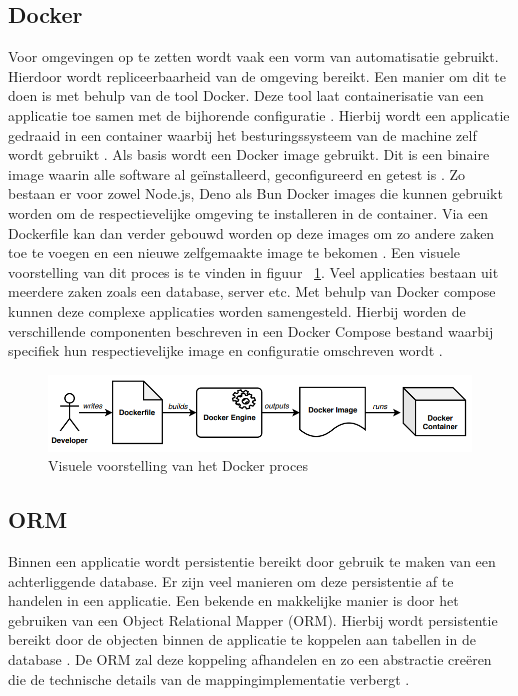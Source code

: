 \subsection{Docker}
Voor omgevingen op te zetten wordt vaak een vorm van automatisatie gebruikt. 
Hierdoor wordt repliceerbaarheid van de omgeving bereikt. Een manier om dit te doen is met behulp van de tool Docker.
Deze tool laat containerisatie van een applicatie toe samen met de bijhorende configuratie \textcite{Ibrahim2021}.
Hierbij wordt een applicatie gedraaid in een container waarbij het besturingssysteem van de machine zelf wordt gebruikt \textcite{Boettiger2015}.
Als basis wordt een Docker image gebruikt. Dit is een binaire image waarin alle software al geïnstalleerd, geconfigureerd en getest is \textcite{Boettiger2015}.
Zo bestaan er voor zowel Node.js, Deno als Bun Docker images die kunnen gebruikt worden om de respectievelijke omgeving te installeren in de container.
Via een Dockerfile kan dan verder gebouwd worden op deze images om zo andere zaken toe te voegen en een nieuwe zelfgemaakte image te bekomen \textcite{Boettiger2015}.
Een visuele voorstelling van dit proces is te vinden in figuur ~\ref{fig:dockerproces}.
Veel applicaties bestaan uit meerdere zaken zoals een database, server etc. 
Met behulp van Docker compose kunnen deze complexe applicaties worden samengesteld. 
Hierbij worden de verschillende componenten beschreven in een Docker Compose bestand waarbij specifiek hun
respectievelijke image en configuratie omschreven wordt \textcite{Ibrahim2021}.
\begin{figure}[H]
    \centering
    \includegraphics[width=.9\textwidth]{graphics/docker_proces.png}
    \caption{\label{fig:dockerproces}Visuele voorstelling van het Docker proces ~\autocite{Ibrahim2021}}
\end{figure}

\subsection{ORM}
Binnen een applicatie wordt persistentie bereikt door gebruik te maken van een achterliggende database. 
Er zijn veel manieren om deze persistentie af te handelen in een applicatie.
 Een bekende en makkelijke manier is door het gebruiken van een Object Relational Mapper (ORM).
Hierbij wordt persistentie bereikt door de objecten binnen de applicatie te koppelen aan tabellen in de database \autocite{Lorenz2017}.
De ORM zal deze koppeling afhandelen en zo een abstractie creëren die de technische details van de mappingimplementatie verbergt \autocite{Lorenz2017}.

